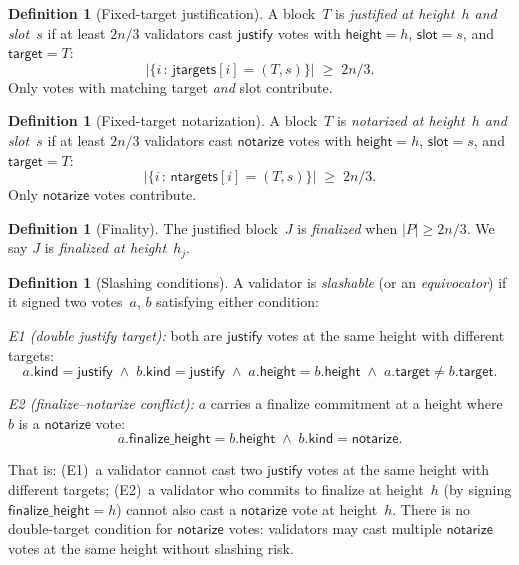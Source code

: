 \documentclass{article}
\newcommand{\target}{\mathsf{target}}
\newcommand{\kind}{\mathsf{kind}}
\newcommand{\height}{\mathsf{height}}
\newcommand{\justify}{\mathsf{justify}}
\newcommand{\notarize}{\mathsf{notarize}}
\theoremstyle{plain}
\theoremstyle{definition}
\newtheorem{definition}[theorem]{Definition}
\theoremstyle{remark}
\begin{document}
\begin{definition}[Fixed-target justification]\label{def:justification}
A block~$T$ is \emph{justified at height~$h$ and slot~$s$} if at least $2n/3$ validators cast $\justify$ votes with $\height = h$, $\mathsf{slot} = s$, and $\target = T$:
\[
  \bigl|\{i \,:\, \mathsf{jtargets}[i] = (T, s)\}\bigr| \;\geq\; 2n/3.
\]
Only votes with matching target \emph{and} slot contribute.
\end{definition}

\begin{definition}[Fixed-target notarization]\label{def:notarization}
A block~$T$ is \emph{notarized at height~$h$ and slot~$s$} if at least $2n/3$ validators cast $\notarize$ votes with $\height = h$, $\mathsf{slot} = s$, and $\target = T$:
\[
  \bigl|\{i \,:\, \mathsf{ntargets}[i] = (T, s)\}\bigr| \;\geq\; 2n/3.
\]
Only $\notarize$ votes contribute.
\end{definition}

\begin{definition}[Finality]\label{def:finality}
The justified block~$J$ is \emph{finalized} when $|P| \geq 2n/3$.
We say $J$ is \emph{finalized at height~$h_j$}.
\end{definition}

\begin{definition}[Slashing conditions]\label{def:slashing}
A validator is \emph{slashable} (or an \emph{equivocator}) if it signed two votes~$a$, $b$ satisfying either condition:

\emph{E1 (double justify target):} both are $\justify$ votes at the same height with different targets:
\[
  a.\kind = \justify
  \;\wedge\;
  b.\kind = \justify
  \;\wedge\;
  a.\height = b.\height
  \;\wedge\;
  a.\target \neq b.\target.
\]

\emph{E2 (finalize--notarize conflict):} $a$ carries a finalize commitment at a height where $b$ is a $\notarize$ vote:
\[
  a.\mathsf{finalize\_height} = b.\height
  \;\wedge\;
  b.\kind = \notarize.
\]

That is: (E1)~a validator cannot cast two $\justify$ votes at the same height with different targets; (E2)~a validator who commits to finalize at height~$h$ (by signing $\mathsf{finalize\_height} = h$) cannot also cast a $\notarize$ vote at height~$h$.
There is no double-target condition for $\notarize$ votes: validators may cast multiple $\notarize$ votes at the same height without slashing risk.
\end{definition}
\end{document}
